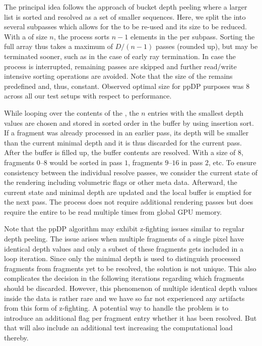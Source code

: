 \documentclass{egpubl}
\newcommand{\dloop}{ppDP}
\begin{document}
The principal idea follows the approach of bucket depth peeling where a larger list is sorted and resolved as a set of smaller sequences. 
Here, we split the \sResolve{} into several subpasses which allows for the \bArray{} to be re-used and its size to be reduced. 
With a \bArray{} of size $n$, the process sorts $n-1$ elements in the \bFraglist{} per subpass. 
Sorting the full array thus takes a maximum of $D/(n-1)$ passes (rounded up), but may be terminated sooner, such as in the case of early ray termination. 
In case the process is interrupted, remaining passes are skipped and further read/write intensive sorting operations are avoided. 
Note that the size of the \bArray{} remains predefined and, thus, constant. 
Observed optimal \bArray{} size for \dloop{} purposes was $8$ across all our test setups with respect to performance. 

While looping over the contents of the \bFraglist{}, the $n$ entries with the smallest depth values are chosen and stored in sorted order in the buffer by using insertion sort.
If a fragment was already processed in an earlier pass, its depth will be smaller than the current minimal depth and it is thus discarded for the current pass.
After the buffer is filled up, the buffer contents are resolved. 
With a \bArray{} size of $8$, fragments $0$--$8$ would be sorted in pass $1$, fragments $9$--$16$ in pass $2$, etc. 
To ensure consistency between the individual resolve passes, we consider the current state of the rendering including volumetric flags or other meta data.
Afterward, the current state and minimal depth are updated and the local buffer is emptied for the next pass. 
The process does not require additional rendering passes but does require the entire \bFraglist{} to be read multiple times from global GPU memory. 

Note that the \dloop{} algorithm may exhibit z-fighting issues similar to regular depth peeling. 
The issue arises when multiple fragments of a single pixel have identical depth values and only a subset of these fragments gets included in a loop iteration. 
Since only the minimal depth is used to distinguish processed fragments from fragments yet to be resolved, the solution is not unique.
This also complicates the decision in the following iterations regarding which fragments should be discarded.
However, this phenomenon of multiple identical depth values inside the data is rather rare and we have so far not experienced any artifacts from this form of z-fighting. 
A potential way to handle the problem is to introduce an additional flag per fragment entry whether it has been resolved.
But that will also include an additional test increasing the computational load thereby.
\end{document}
